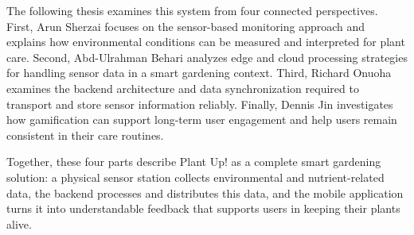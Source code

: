 The following thesis examines this system from four connected perspectives. First, Arun Sherzai focuses on the sensor-based monitoring approach and explains how environmental conditions can be measured and interpreted for plant care. Second, Abd-Ulrahman Behari analyzes edge and cloud processing strategies for handling sensor data in a smart gardening context. Third, Richard Onuoha examines the backend architecture and data synchronization required to transport and store sensor information reliably. Finally, Dennis Jin investigates how gamification can support long-term user engagement and help users remain consistent in their care routines.

Together, these four parts describe Plant Up! as a complete smart gardening solution: a physical sensor station collects environmental and nutrient-related data, the backend processes and distributes this data, and the mobile application turns it into understandable feedback that supports users in keeping their plants alive.
